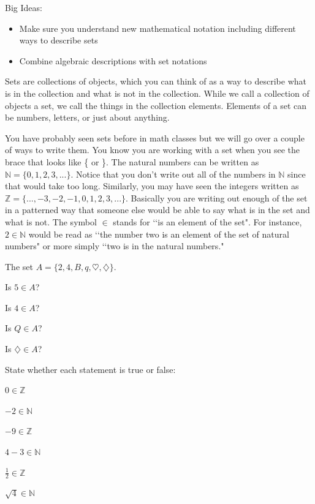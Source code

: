Big Ideas:
\begin{itemize}
\item Make sure you understand new mathematical notation including different ways to describe sets
\item Combine algebraic descriptions with set notations
\end{itemize}
\begin{info}
Sets are collections of objects, which you can think of as a way to describe what is in the collection and what is not in the collection. While we call a collection of objects a set, we call the things in the collection elements. Elements of a set can be numbers, letters, or just about anything.

You have probably seen sets before in math classes but we will go over a couple of ways to write them. You know you are working with a set when you see the brace that looks like \{ or \}. The natural numbers can be written as $\mathbb{N} = \{0,1,2,3,... \}$. Notice that you don't write out all of the numbers in $\mathbb{N}$ since that would take too long. Similarly, you may have seen the integers written as $\mathbb{Z}=\{ ...,-3,-2,-1,0,1,2,3,... \}$. Basically you are writing out enough of the set in a patterned way that someone else would be able to say what is in the set and what is not. The symbol $\in$ stands for \lq\lq{is an element of the set}". For instance, $ 2 \in \mathbb{N}$ would be read as \lq\lq{the number two is an element of the set of natural numbers}" or more simply \lq\lq{two is in the natural numbers}."
\end{info}
\bq The set $A=\{2,4,B,q,\heartsuit,\diamondsuit \}$.
\be
\item Is $5 \in A$?
\item Is $4 \in A$?
\item Is $Q \in A$?
\item Is $\diamondsuit \in A$?
\ee
\eq


\bq State whether each statement is true or false:
\be
\item $0 \in \mathbb{Z}$
\item $-2 \in \mathbb{N}$
\item $-9 \in \mathbb{Z}$
\item $4-3 \in \mathbb{N}$
\item $\frac{1}{2} \in \mathbb{Z}$
\item $\sqrt{4} \in \mathbb{N}$
\ee \eq

